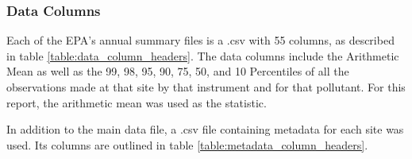 \documentclass{article}
\begin{document}
\subsubsection*{Data Columns}
\label{subsubsec:datacolumns}
Each of the \ac{EPA}'s annual summary files is a .csv with 55 columns, as described in table \ref{table:data_column_headers}.  The data columns include the Arithmetic Mean as well as the 99, 98, 95, 90, 75, 50, and 10 Percentiles of all the observations made at that site by that instrument and for that pollutant.  For this report, the arithmetic mean 
was used as the statistic.  

In addition to the main data file, a .csv file containing metadata for each site was used. Its columns are outlined in table \ref{table:metadata_column_headers}.
\end{document}
